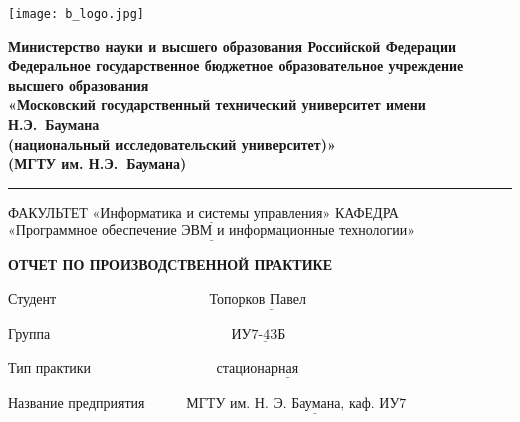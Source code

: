 \begin{titlepage}
	\noindent \begin{minipage}{0.15\textwidth}
		\texttt{[image: b\_logo.jpg]}
	\end{minipage}
	\noindent\begin{minipage}{0.9\textwidth}\centering
		\textbf{Министерство науки и высшего образования Российской Федерации}\\
		\textbf{Федеральное государственное бюджетное образовательное учреждение высшего образования}\\
		\textbf{«Московский государственный технический университет имени Н.Э.~Баумана}\\
		\textbf{(национальный исследовательский университет)»}\\
		\textbf{(МГТУ им. Н.Э.~Баумана)}
	\end{minipage}
	
	\noindent\rule{18cm}{3pt}
	\newline
	\noindent ФАКУЛЬТЕТ $\underline{\text{«Информатика и системы управления»}}$ \newline
	\noindent КАФЕДРА $\underline{\text{«Программное обеспечение ЭВМ и информационные технологии»}}$\newline
	
	
	\begin{center}
		\noindent\begin{minipage}{1.2\textwidth}\centering
			\textbf{ ОТЧЕТ ПО ПРОИЗВОДСТВЕННОЙ ПРАКТИКЕ }\newline\newline\newline
		\end{minipage}
	\end{center}
	
	\noindent Студент $\underline{\text{~~~~~~~~~~~~~~~~~~~~~~~~~~~~~~~~Топорков Павел~~~~~~~~~~~~~~~~~~~~~~~~~~~~~~~~~~~~~~}}$
	
	\noindent Группа $\underline{\text{~~~~~~~~~~~~~~~~~~~~~~~~~~~~~~~~~~~~~~ИУ7-43Б~~~~~~~~~~~~~~~~~~~~~~~~~~~~~~~~~~~~~~~~~}}$
	
	\noindent Тип практики $\underline{\text{~~~~~~~~~~~~~~~~~~~~~~~~~~стационарная~~~~~~~~~~~~~~~~~~~~~~~~~~~~~~~~~~~~~~~}}$
	
	\noindent Название предприятия $\underline{\text{~~~~~~~~МГТУ им. Н. Э. Баумана, каф. ИУ7~~~~~~~~~~~~~~~~}}$\newline
	

\end{titlepage}
